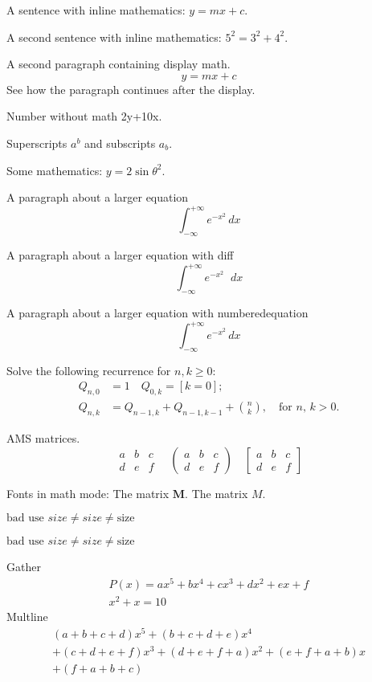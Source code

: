 \documentclass{article}
\newcommand{\diff}{\mathop{}\!d}
\begin{document}
 A sentence with inline mathematics: $y = mx + c$.

 A second sentence with inline mathematics:
 \(5^{2}=3^{2}+4^{2}\).
 
A second paragraph containing display math.
 \[
 y = mx + c
 \]
 See how the paragraph continues after the display.

Number without math 2y+10x.

Superscripts $a^{b}$ and subscripts $a_{b}$.

Some mathematics: $y = 2 \sin \theta^{2}$.

A paragraph about a larger equation
 \[
 \int_{-\infty}^{+\infty} e^{-x^2} \, dx
 \]

 A paragraph about a larger equation with diff
 \[
 \int_{-\infty}^{+\infty} e^{-x^2} \diff x
 \]

A paragraph about a larger equation with numberedequation
 \begin{equation}
 \int_{-\infty}^{+\infty} e^{-x^2} \, dx
 \end{equation}

Solve the following recurrence for $ n,k\geq 0 $:
 \begin{align*}
 Q_{n,0} &= 1 \quad Q_{0,k} = [k=0]; \\
 Q_{n,k} &= Q_{n-1,k}+Q_{n-1,k-1}+\binom{n}{k}, \quad\text{for $n$, $k>0$.}
 \end{align*}

AMS matrices.
 \[
 \begin{matrix}
 a & b & c \\
 d & e & f
 \end{matrix}
 \quad
 \begin{pmatrix}
 a & b & c \\
 d & e & f
 \end{pmatrix}
 \quad
 \begin{bmatrix}
 a & b & c \\
 d & e & f
 \end{bmatrix}
 \]

Fonts in math mode: The matrix $\mathbf{M}$. The matrix $\mathit{M}$.

$\text{bad use } size \neq \mathit{size} \neq \mathrm{size} $

\textit{$\text{bad use } size \neq \mathit{size} \neq \mathrm{size} $}

Gather
 \begin{gather}
 P(x)=ax^{5}+bx^{4}+cx^{3}+dx^{2}+ex +f\\
 x^2+x=10
 \end{gather}
 Multline
 \begin{multline*}
 (a+b+c+d)x^{5}+(b+c+d+e)x^{4} \\
 +(c+d+e+f)x^{3}+(d+e+f+a)x^{2}+(e+f+a+b)x\\
 + (f+a+b+c)
 \end{multline*}
\end{document}
